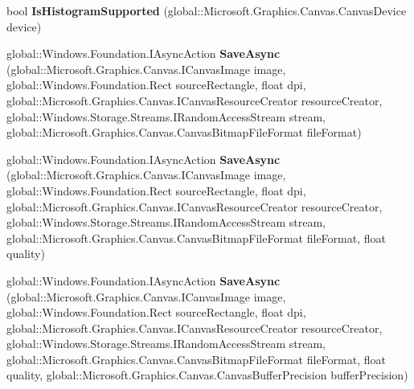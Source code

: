 \begin{DoxyCompactItemize}
\item 
\mbox{\label{interface_microsoft_1_1_graphics_1_1_canvas_1_1_i_canvas_image_statics_ae36ced4f89421bf05ceea6e51eb6f95b}} 
bool {\bfseries Is\+Histogram\+Supported} (global\+::\+Microsoft.\+Graphics.\+Canvas.\+Canvas\+Device device)
\item 
\mbox{\label{interface_microsoft_1_1_graphics_1_1_canvas_1_1_i_canvas_image_statics_a24c2e03f2a0d0284e0926c456f6c05cd}} 
global\+::\+Windows.\+Foundation.\+I\+Async\+Action {\bfseries Save\+Async} (global\+::\+Microsoft.\+Graphics.\+Canvas.\+I\+Canvas\+Image image, global\+::\+Windows.\+Foundation.\+Rect source\+Rectangle, float dpi, global\+::\+Microsoft.\+Graphics.\+Canvas.\+I\+Canvas\+Resource\+Creator resource\+Creator, global\+::\+Windows.\+Storage.\+Streams.\+I\+Random\+Access\+Stream stream, global\+::\+Microsoft.\+Graphics.\+Canvas.\+Canvas\+Bitmap\+File\+Format file\+Format)
\item 
\mbox{\label{interface_microsoft_1_1_graphics_1_1_canvas_1_1_i_canvas_image_statics_a1d356baa8a7f7e5d8a5a583ba30a2008}} 
global\+::\+Windows.\+Foundation.\+I\+Async\+Action {\bfseries Save\+Async} (global\+::\+Microsoft.\+Graphics.\+Canvas.\+I\+Canvas\+Image image, global\+::\+Windows.\+Foundation.\+Rect source\+Rectangle, float dpi, global\+::\+Microsoft.\+Graphics.\+Canvas.\+I\+Canvas\+Resource\+Creator resource\+Creator, global\+::\+Windows.\+Storage.\+Streams.\+I\+Random\+Access\+Stream stream, global\+::\+Microsoft.\+Graphics.\+Canvas.\+Canvas\+Bitmap\+File\+Format file\+Format, float quality)
\item 
\mbox{\label{interface_microsoft_1_1_graphics_1_1_canvas_1_1_i_canvas_image_statics_a21753a6236cd5f5b4187172eb1f59d72}} 
global\+::\+Windows.\+Foundation.\+I\+Async\+Action {\bfseries Save\+Async} (global\+::\+Microsoft.\+Graphics.\+Canvas.\+I\+Canvas\+Image image, global\+::\+Windows.\+Foundation.\+Rect source\+Rectangle, float dpi, global\+::\+Microsoft.\+Graphics.\+Canvas.\+I\+Canvas\+Resource\+Creator resource\+Creator, global\+::\+Windows.\+Storage.\+Streams.\+I\+Random\+Access\+Stream stream, global\+::\+Microsoft.\+Graphics.\+Canvas.\+Canvas\+Bitmap\+File\+Format file\+Format, float quality, global\+::\+Microsoft.\+Graphics.\+Canvas.\+Canvas\+Buffer\+Precision buffer\+Precision)

\end{DoxyCompactItemize}
